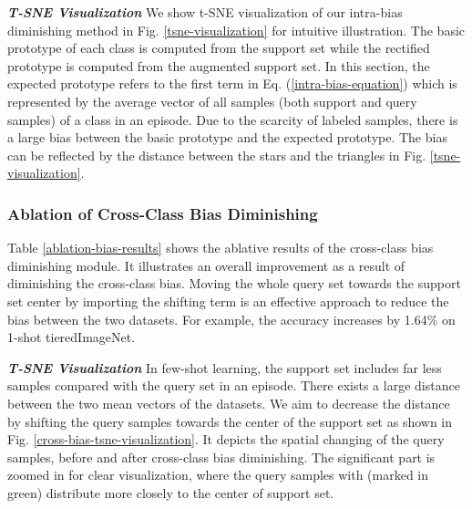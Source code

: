 \documentclass[runningheads]{llncs}
\begin{document}
\textbf{\textit{T-SNE Visualization}}
We show t-SNE visualization of our intra-bias diminishing method in Fig. \ref{tsne-visualization} for intuitive illustration. The basic prototype of each class is computed from the support set while the rectified prototype is computed from the augmented support set. In this section, the expected prototype refers to the first term in Eq. (\ref{intra-bias-equation}) which is represented by the average vector of all samples (both support and query samples) of a class in an episode. Due to the scarcity of labeled samples, there is a large bias between the basic prototype and the expected prototype. The bias can be reflected by the distance between the stars and the triangles in Fig. \ref{tsne-visualization}. 




\subsubsection{Ablation of Cross-Class Bias Diminishing} 
Table \ref{ablation-bias-results} shows the ablative results of the cross-class bias diminishing module. It illustrates an overall improvement as a result of diminishing the cross-class bias. Moving the whole query set towards the support set center by importing the shifting term  is an effective approach to reduce the bias between the two datasets. For example, the accuracy increases by 1.64\% on 1-shot tieredImageNet.





\textbf{\textit{T-SNE Visualization} }
In few-shot learning, the support set includes far less samples compared with the query set in an episode. There exists a large distance between the two mean vectors of the datasets. We aim to decrease the distance by shifting the query samples towards the center of the support set as shown in Fig. \ref{cross-bias-tsne-visualization}.
It depicts the spatial changing of the query samples, before and after cross-class bias diminishing. The significant part is zoomed in for clear visualization, where the query samples with  (marked in green) distribute more closely to the center of support set. 
\end{document}
